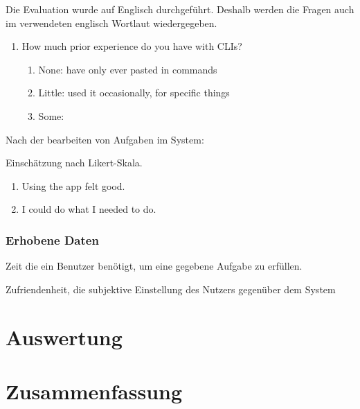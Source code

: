 \documentclass[oneside,bibliography=totocnumbered,BCOR=5mm]{scrbook}
\begin{document}
Die Evaluation wurde auf Englisch durchgeführt. Deshalb werden die Fragen auch im
verwendeten englisch Wortlaut wiedergegeben.

\begin{enumerate}
  \item How much prior experience do you have with CLIs?
    \begin{enumerate}
      \item None: have only ever pasted in commands
      \item Little: used it occasionally, for specific things
      \item Some:
    \end{enumerate}
\end{enumerate}

Nach der bearbeiten von Aufgaben im System:

Einschätzung nach Likert-Skala.

\begin{enumerate}
  \item Using the app felt good.
  \item I could do what I needed to do.
\end{enumerate}

\subsection{Erhobene Daten}

Zeit die ein Benutzer benötigt, um eine gegebene Aufgabe zu erfüllen.

Zufriendenheit, die subjektive Einstellung des Nutzers gegenüber dem System


\chapter{Auswertung}

\chapter{Zusammenfassung}
\end{document}
